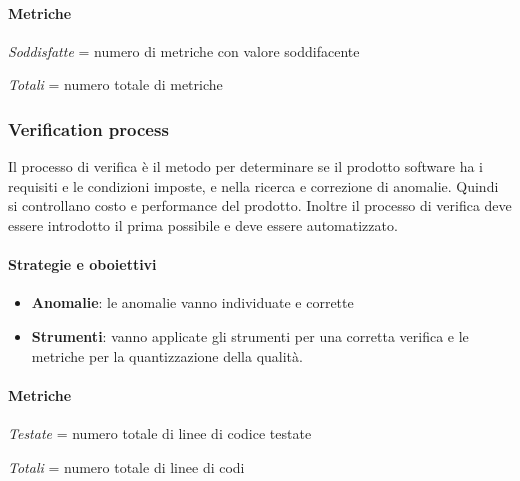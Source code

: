             \paragraph{Metriche}
            \hphantom{}
            \def\productquality{
                {   Percentuale di metriche soddisfatte,
                    $\frac{Soddisfatte}{Totali}$,
                    $ \geq 60 \%$,
                    $ \geq 80 \% $
                },
            }
            
            
\textit{Soddisfatte} = numero di metriche con valore soddifacente

\textit{Totali} = numero totale di metriche
 
            \newpage
            \subsubsection{Verification process}
            Il processo di verifica è il metodo per determinare se il prodotto software ha i requisiti e le condizioni imposte, e nella ricerca e correzione di anomalie. Quindi si controllano costo e performance del prodotto. Inoltre il processo di verifica deve essere introdotto il prima possibile e deve essere automatizzato.
            
            \paragraph{Strategie e oboiettivi}
            \begin{itemize}
                \item \textbf{Anomalie}: le anomalie vanno individuate e corrette
                \item \textbf{Strumenti}: vanno applicate gli strumenti per una corretta verifica e le metriche per la quantizzazione della qualità.
            \end{itemize}
            
            \paragraph{Metriche}
            
            \hphantom{}
            \def\productquality{
                {   Code coverage,
                    $\frac{Testate}{Totali}$,
                    $ 75 \%$,
                    $ 100 \% $
                },
                {   Numero di test superati,
                    numero intero,
                    = numero totale di test,
                    = numero totale di test
                },
            }
            
            
\textit{Testate} = numero totale di linee di codice testate

\textit{Totali} = numero totale di linee di codi
